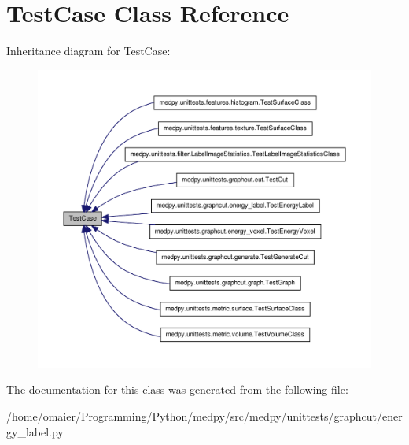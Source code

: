\hypertarget{classunittest_1_1TestCase}{
\section{TestCase Class Reference}
\label{classunittest_1_1TestCase}
}


Inheritance diagram for TestCase:\nopagebreak
\begin{figure}[H]
\begin{center}
\leavevmode
\includegraphics[width=400pt]{classunittest_1_1TestCase__inherit__graph}
\end{center}
\end{figure}


The documentation for this class was generated from the following file:\begin{DoxyCompactItemize}
\item 
/home/omaier/Programming/Python/medpy/src/medpy/unittests/graphcut/energy\_\-label.py\end{DoxyCompactItemize}
